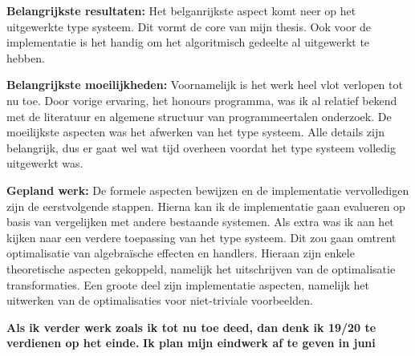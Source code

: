 \documentclass[12pt]{report}
\begin{document}
\vspace{1cm}
{\bf Belangrijkste resultaten:}
Het belganrijkste aspect komt neer op het uitgewerkte type systeem. Dit vormt de core van mijn thesis. Ook voor de implementatie is het handig om het algoritmisch gedeelte al uitgewerkt te hebben.


\vspace{1cm}
{\bf Belangrijkste moeilijkheden:}
Voornamelijk is het werk heel vlot verlopen tot nu toe. Door vorige ervaring, het honours programma, was ik al relatief bekend met de literatuur en algemene structuur van programmeertalen onderzoek. De moeilijkste aspecten was het afwerken van het type systeem. Alle details zijn belangrijk, dus er gaat wel wat tijd overheen voordat het type systeem volledig uitgewerkt was.

\vspace{1cm}
{\bf Gepland werk:}
De formele aspecten bewijzen en de implementatie vervolledigen zijn de eerstvolgende stappen. Hierna kan ik de implementatie gaan evalueren op basis van vergelijken met andere bestaande systemen. Als extra was ik aan het kijken naar een verdere toepassing van het type systeem. Dit zou gaan omtrent optimalisatie van algebraïsche effecten en handlers. Hieraan zijn enkele theoretische aspecten gekoppeld, namelijk het uitschrijven van de optimalisatie transformaties. Een groote deel zijn implementatie aspecten, namelijk het uitwerken van de optimalisaties voor niet-triviale voorbeelden.


\vspace{1cm}
{\bf Als ik verder werk zoals ik tot nu toe deed, dan denk ik 19/20 te verdienen op het einde.}
{\bf Ik plan mijn eindwerk af te geven in juni}
\end{document}

